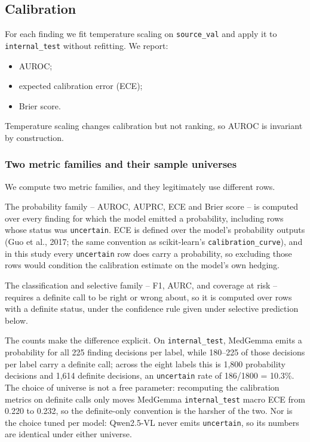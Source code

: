 \subsection{Calibration}

For each finding we fit temperature scaling on \texttt{source\_val} and apply it to \texttt{internal\_test} without refitting. We report:

\begin{itemize}
\item AUROC;
\item expected calibration error (ECE);
\item Brier score.
\end{itemize}

Temperature scaling changes calibration but not ranking, so AUROC is invariant by construction.

\subsubsection{Two metric families and their sample universes}

We compute two metric families, and they legitimately use different rows.

The probability family -- AUROC, AUPRC, ECE and Brier score -- is computed over every finding for which the model emitted a probability, including rows whose status was \texttt{uncertain}. ECE is defined over the model's probability outputs (Guo et al., 2017; the same convention as scikit-learn's \texttt{calibration\_curve}), and in this study every \texttt{uncertain} row does carry a probability, so excluding those rows would condition the calibration estimate on the model's own hedging.

The classification and selective family -- F1, AURC, and coverage at risk -- requires a definite call to be right or wrong about, so it is computed over rows with a definite status, under the confidence rule given under selective prediction below.

The counts make the difference explicit. On \texttt{internal\_test}, MedGemma emits a probability for all 225 finding decisions per label, while 180--225 of those decisions per label carry a definite call; across the eight labels this is 1,800 probability decisions and 1,614 definite decisions, an \texttt{uncertain} rate of 186/1800 = 10.3\%. The choice of universe is not a free parameter: recomputing the calibration metrics on definite calls only moves MedGemma \texttt{internal\_test} macro ECE from 0.220 to 0.232, so the definite-only convention is the harsher of the two. Nor is the choice tuned per model: Qwen2.5-VL never emits \texttt{uncertain}, so its numbers are identical under either universe.

